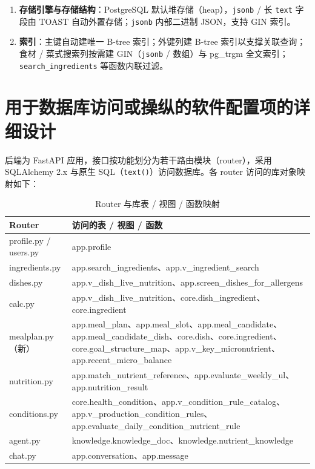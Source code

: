\documentclass[12pt,a4paper]{ctexart}
\begin{document}
\begin{enumerate}
\item \textbf{存储引擎与存储结构}：PostgreSQL 默认堆存储（heap），\texttt{jsonb} / 长 \texttt{text} 字段由 TOAST 自动外置存储；\texttt{jsonb} 内部二进制 JSON，支持 GIN 索引。
\item \textbf{索引}：主键自动建唯一 B-tree 索引；外键列建 B-tree 索引以支撑关联查询；食材 / 菜式搜索列按需建 GIN（\texttt{jsonb} / 数组）与 pg\_trgm 全文索引；\texttt{search\_ingredients} 等函数内联过滤。
\end{enumerate}

\section{用于数据库访问或操纵的软件配置项的详细设计}

后端为 FastAPI 应用，接口按功能划分为若干路由模块（router），采用 SQLAlchemy 2.x 与原生 SQL（\texttt{text()}）访问数据库。各 router 访问的库对象映射如下：
\vspace{-0.3em}
\begin{xltabular}{\linewidth}{Q{3.4cm}L}
\caption{Router 与库表 / 视图 / 函数映射} \\
\toprule
\textbf{Router} & \textbf{访问的表 / 视图 / 函数} \\
\midrule
\endhead
profile.py / users.py & app.profile \\
ingredients.py & app.search\_ingredients、app.v\_ingredient\_search \\
dishes.py & app.v\_dish\_live\_nutrition、app.screen\_dishes\_for\_allergens \\
calc.py & app.v\_dish\_live\_nutrition、core.dish\_ingredient、core.ingredient \\
mealplan.py（新） & app.meal\_plan、app.meal\_slot、app.meal\_candidate、app.meal\_candidate\_dish、core.dish、core.ingredient、core.goal\_structure\_map、app.v\_key\_micronutrient、app.recent\_micro\_balance \\
nutrition.py & app.match\_nutrient\_reference、app.evaluate\_weekly\_ul、app.nutrition\_result \\
conditions.py & core.health\_condition、app.v\_condition\_rule\_catalog、app.v\_production\_condition\_rules、app.evaluate\_daily\_condition\_nutrient\_rule \\
agent.py & knowledge.knowledge\_doc、knowledge.nutrient\_knowledge \\
chat.py & app.conversation、app.message \\
\bottomrule
\end{xltabular}
\end{document}
